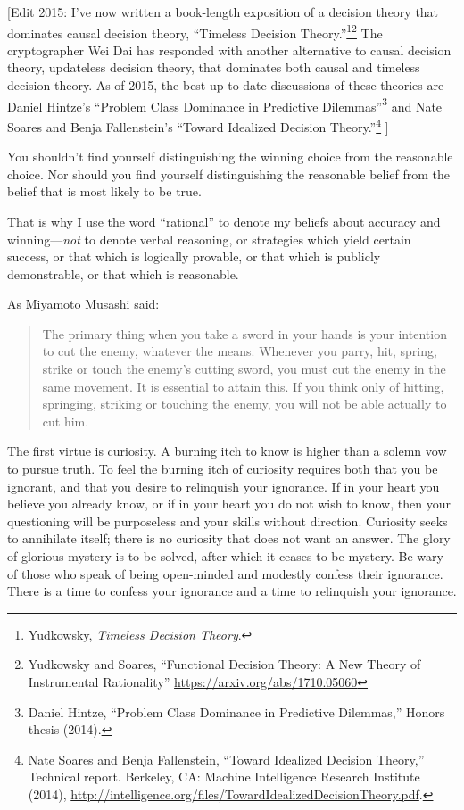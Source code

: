 {
 [Edit 2015: I've now written a book-length
exposition of a decision theory that dominates causal decision theory,
``Timeless Decision
Theory.''\footnote{Yudkowsky, \textit{Timeless Decision Theory}.}\supercomma\footnote{Yudkowsky and Soares, ``Functional Decision Theory: A New Theory of Instrumental Rationality'' \url{https://arxiv.org/abs/1710.05060}} The cryptographer Wei
Dai has responded with another alternative to causal decision theory,
updateless decision theory, that dominates both causal and timeless
decision theory. As of 2015, the best up-to-date discussions of these
theories are Daniel Hintze's ``Problem
Class Dominance in Predictive
Dilemmas''\footnote{Daniel Hintze, ``Problem Class Dominance in
Predictive Dilemmas,'' Honors thesis (2014).} and Nate Soares and
Benja Fallenstein's ``Toward Idealized
Decision Theory.''\footnote{Nate Soares and Benja Fallenstein, ``Toward
Idealized Decision Theory,'' Technical report.
Berkeley, CA: Machine Intelligence Research Institute (2014),
\url{http://intelligence.org/files/TowardIdealizedDecisionTheory.pdf}.} ]}


 You shouldn't find yourself distinguishing the
winning choice from the reasonable choice. Nor should you find yourself
distinguishing the reasonable belief from the belief that is most
likely to be true.


 That is why I use the word
``rational'' to denote my beliefs
about accuracy and winning---\textit{not} to denote verbal reasoning,
or strategies which yield certain success, or that which is logically
provable, or that which is publicly demonstrable, or that which is
reasonable.


 As Miyamoto Musashi said:

\begin{quote}
{
 The primary thing when you take a sword in your hands is your
intention to cut the enemy, whatever the means. Whenever you parry,
hit, spring, strike or touch the enemy's cutting sword,
you must cut the enemy in the same movement. It is essential to attain
this. If you think only of hitting, springing, striking or touching the
enemy, you will not be able actually to cut him.}
\end{quote}

\myendsectiontext

\label{twelve_virtues}


 The first virtue is curiosity. A burning itch to know is higher
than a solemn vow to pursue truth. To feel the burning itch of
curiosity requires both that you be ignorant, and that you desire to
relinquish your ignorance. If in your heart you believe you already
know, or if in your heart you do not wish to know, then your
questioning will be purposeless and your skills without direction.
Curiosity seeks to annihilate itself; there is no curiosity that does
not want an answer. The glory of glorious mystery is to be solved,
after which it ceases to be mystery. Be wary of those who speak of
being open-minded and modestly confess their ignorance. There is a time
to confess your ignorance and a time to relinquish your ignorance.


